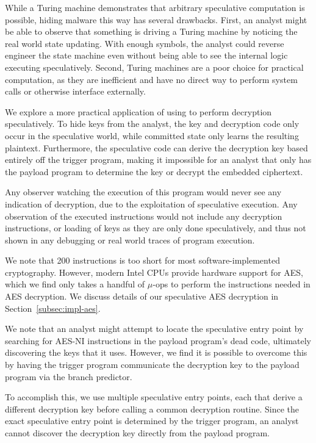 While a Turing machine demonstrates that arbitrary speculative computation
is possible, hiding malware this way has several drawbacks. First, an
analyst might be able to observe that something is driving a Turing
machine by noticing the real world state updating. With enough symbols, the
analyst could reverse engineer the state machine even without being able to see
the internal logic executing speculatively. Second, Turing machines are a
poor choice for practical computation, as they are inefficient and have no direct
way to perform system calls or otherwise interface externally.

We explore a more practical application of using \speculake to perform
decryption speculatively. To hide keys from the analyst, the key and decryption
code only occur in the speculative world, while committed state only learns the
resulting plaintext. Furthermore, the speculative code can
derive the decryption key based entirely off the trigger program, making it
impossible for an analyst that only has the payload program to
determine the key or decrypt the embedded ciphertext.


Any observer watching the execution of this program would never see any
indication of decryption, due to the exploitation of speculative execution. Any
observation of the executed instructions would not include any decryption
instructions, or loading of keys as they are only done speculatively, and thus
not shown in any debugging or real world traces of program execution. 

We note that 200 instructions is too short for most software-implemented
cryptography. However, modern Intel CPUs provide hardware support for AES, which
we find only takes a handful of $\mu$-ops to perform the instructions needed in
AES decryption. We discuss details of our speculative AES decryption in
Section~\ref{subsec:impl-aes}.

\medskip

We note that an analyst might attempt to locate the speculative entry point by
searching for AES-NI instructions in the payload program's dead code, ultimately
discovering the keys that it uses. However, we find it is possible to overcome
this by having the trigger program communicate the decryption key to the payload
program via the branch predictor.

To accomplish this, we use multiple speculative entry points, each that derive a
different decryption key before calling a common decryption routine. Since
the exact speculative entry point is determined by the trigger program, an
analyst cannot discover the decryption key directly from the payload program.

